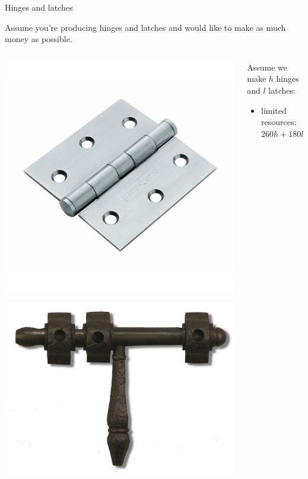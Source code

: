 \begin{frame}{Hinges and latches}

\pause Assume you're producing hinges and latches and would like to make as much money as possible.

\begin{columns}

 \begin{column}{0.4\linewidth}

\includegraphics[width=0.8\linewidth]{hinges.jpg}

\includegraphics[width=0.8\linewidth]{latch.jpg}

 \end{column}
 \begin{column}{0.5\linewidth}
 Assume we make $h$ hinges and $l$ latches:
  \begin{itemize}
\pause\item limited resources: $260h + 180l < 2400$


\end{itemize}
\end{column}
\end{columns}
\end{frame}
